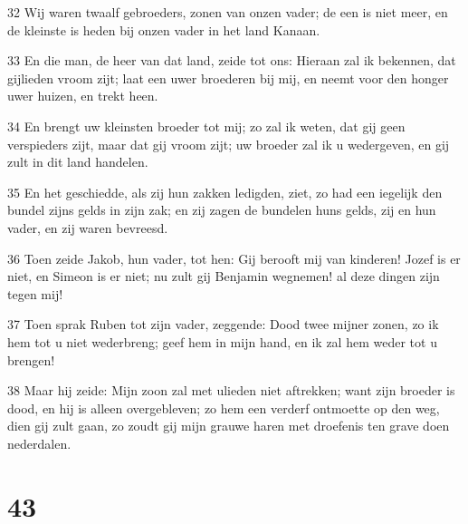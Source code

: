 \par 32 Wij waren twaalf gebroeders, zonen van onzen vader; de een is niet meer, en de kleinste is heden bij onzen vader in het land Kanaan.
\par 33 En die man, de heer van dat land, zeide tot ons: Hieraan zal ik bekennen, dat gijlieden vroom zijt; laat een uwer broederen bij mij, en neemt voor den honger uwer huizen, en trekt heen.
\par 34 En brengt uw kleinsten broeder tot mij; zo zal ik weten, dat gij geen verspieders zijt, maar dat gij vroom zijt; uw broeder zal ik u wedergeven, en gij zult in dit land handelen.
\par 35 En het geschiedde, als zij hun zakken ledigden, ziet, zo had een iegelijk den bundel zijns gelds in zijn zak; en zij zagen de bundelen huns gelds, zij en hun vader, en zij waren bevreesd.
\par 36 Toen zeide Jakob, hun vader, tot hen: Gij berooft mij van kinderen! Jozef is er niet, en Simeon is er niet; nu zult gij Benjamin wegnemen! al deze dingen zijn tegen mij!
\par 37 Toen sprak Ruben tot zijn vader, zeggende: Dood twee mijner zonen, zo ik hem tot u niet wederbreng; geef hem in mijn hand, en ik zal hem weder tot u brengen!
\par 38 Maar hij zeide: Mijn zoon zal met ulieden niet aftrekken; want zijn broeder is dood, en hij is alleen overgebleven; zo hem een verderf ontmoette op den weg, dien gij zult gaan, zo zoudt gij mijn grauwe haren met droefenis ten grave doen nederdalen.

\chapter{43}

